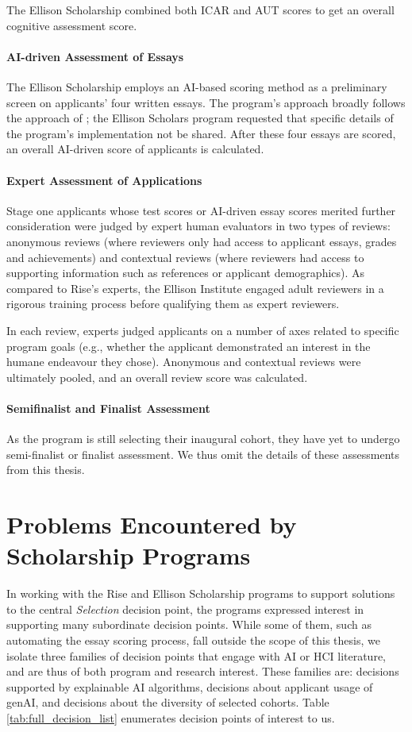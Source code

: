 The Ellison Scholarship combined both ICAR and AUT scores to get an overall cognitive assessment score.

\paragraph{AI-driven Assessment of Essays}
The Ellison Scholarship employs an AI-based scoring method as a preliminary screen on applicants' four written essays. The program's approach broadly follows the approach of \textcite{xiao2024humanaicollaborativeessayscoring}; the Ellison Scholars program requested that specific details of the program's implementation not be shared. After these four essays are scored, an overall AI-driven score of applicants is calculated.

\paragraph{Expert Assessment of Applications}
Stage one applicants whose test scores or AI-driven essay scores merited further consideration were judged by expert human evaluators in two types of reviews: anonymous reviews (where reviewers only had access to applicant essays, grades and achievements) and contextual reviews (where reviewers had access to supporting information such as references or applicant demographics). As compared to Rise's experts, the Ellison Institute engaged adult reviewers in a rigorous training process before qualifying them as expert reviewers.

In each review, experts judged applicants on a number of axes related to specific program goals (e.g., whether the applicant demonstrated an interest in the humane endeavour they chose). Anonymous and contextual reviews were ultimately pooled, and an overall review score was calculated.

\paragraph{Semifinalist and Finalist Assessment}
As the program is still selecting their inaugural cohort, they have yet to undergo semi-finalist or finalist assessment. We thus omit the details of these assessments from this thesis.

\section{Problems Encountered by Scholarship Programs}
In working with the Rise and Ellison Scholarship programs to support solutions to the central \emph{Selection} decision point, the programs expressed interest in supporting many subordinate decision points. While some of them, such as automating the essay scoring process, fall outside the scope of this thesis, we isolate three families of decision points that engage with AI or HCI literature, and are thus of both program and research interest. These families are: decisions supported by explainable AI algorithms, decisions about applicant usage of genAI, and decisions about the diversity of selected cohorts. Table \ref{tab:full_decision_list} enumerates decision points of interest to us. 

